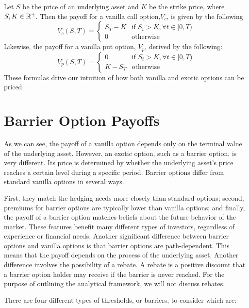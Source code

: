Let $S$ be the price of an underlying asset and $K$ be the strike price, where $S,K\in\amsbb{R}^+$. Then the payoff for a vanilla call option,$V_c$, is given by the following
\begin{equation}\label{eq:vanilla_call}
	V_c(S,T)=\begin{cases}
		S_T-K  & \text{if }S_t>K,\forall t\in[0,T) \\
		0 & \text{otherwise}
	\end{cases}
\end{equation}
Likewise, the payoff for a vanilla put option, $V_p$, derived by the following:
\begin{equation}
	V_p(S,T)=\begin{cases}\label{eq:vanilla_put}
		0 & \text{if }S_t>K,\forall t\in[0,T) \\
		K-S_T  & \text{otherwise}
	\end{cases}
\end{equation}
These formulas drive our intuition of how both vanilla and exotic options can be priced.
\section{Barrier Option Payoffs}
As we can see, the payoff of a vanilla option depends only on the terminal value of the underlying asset. However, an exotic option, such as a barrier option, is very different. Its price is determined by whether the underlying asset's price reaches a certain level during a specific period. Barrier options differ from standard vanilla options in several ways. 

First, they match the hedging needs more closely than standard options; second, premiums for barrier options are typically lower than vanilla options; and finally, the payoff of a barrier option matches beliefs about the future behavior of the market. These features benefit many different types of investors, regardless of experience or financial needs. Another significant difference between barrier options and vanilla options is that barrier options are path-dependent. This means that the payoff depends on the process of the underlying asset. Another difference involves the possibility of a rebate. A rebate is a positive discount that a barrier option holder may receive if the barrier is never reached. For the purpose of outlining the analytical framework, we will not discuss rebates.

There are four different types of thresholds, or barriers, to consider which are:

